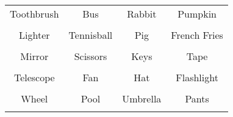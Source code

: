 \documentclass[12pt,a4paper]{article}
\begin{document}
\thispagestyle{empty}
\begin{table}[]
\centering
\Huge
\begin{tabular}{cccc}
 Toothbrush& Bus& Rabbit& Pumpkin\\  & & & \\
 Lighter& Tennisball& Pig& French Fries\\  & & & \\
 Mirror& Scissors& Keys& Tape\\  & & & \\
 Telescope& Fan& Hat& Flashlight\\  & & & \\
 Wheel& Pool& Umbrella& Pants\\  & & & \\
\end{tabular}
\end{table}
\end{document}
